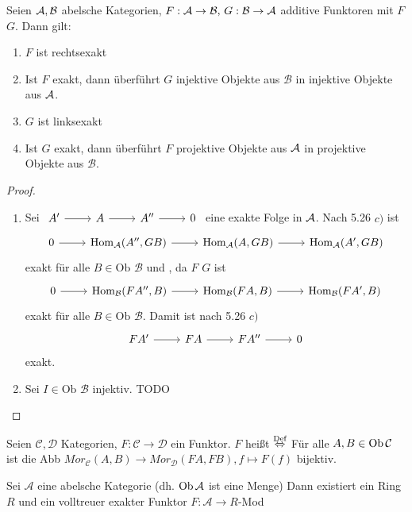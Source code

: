 \begin{sa}\label{5.33}
	Seien $\mathcal{A}, \mathcal{B}$ abelsche Kategorien, $F:\mathcal{A} \to \mathcal{B}, \, G: \mathcal{B} \to \mathcal{A}$ additive Funktoren mit $F$  $G$. Dann gilt:
	\begin{enumerate}[label= \alph*)]
		\item $F$ ist rechtsexakt
		\item Ist $F$ exakt, dann überführt $G$ injektive Objekte aus $\mathcal{B}$ in injektive Objekte aus $\mathcal{A}$.
		\item $G$ ist linksexakt
		\item Ist $G$ exakt, dann überführt $F$ projektive Objekte aus $\mathcal{A}$ in projektive Objekte aus $\mathcal{B}$.
	\end{enumerate}
\end{sa}
\begin{proof}
	\begin{enumerate}[label= \alph*)]
		\item Sei $\begin{tikzcd}
		A' \arrow{r} & A \arrow{r} & A'' \arrow{r} & 0
		\end{tikzcd}$ eine exakte Folge in $\mathcal{A}$. Nach 5.26 $c)$ ist 
			$$\begin{tikzcd}
		0 \arrow{r}& \Hom_\A(A'', GB) \arrow{r} & \Hom_\A(A,GB) \arrow{r} & \Hom_\A(A',GB)
		\end{tikzcd}$$
		exakt für alle $B\in \text{Ob }\mathcal{B}$ und , da $F$   $G$ ist
		$$\begin{tikzcd}
		0 \arrow{r}& \Hom_\mathcal{B}(FA'', B) \arrow{r} & \Hom_\mathcal{B}(FA,B) \arrow{r} & \Hom_\mathcal{B}(FA',B)
		\end{tikzcd}$$
		exakt für alle $B\in \text{Ob }\mathcal{B}$. Damit ist nach 5.26 $c)$
		$$\begin{tikzcd}
		FA' \arrow{r} & FA \arrow{r} & FA'' \arrow{r} & 0
		\end{tikzcd}$$
		exakt.
		\item Sei $I\in \text{Ob } \mathcal{B}$ injektiv.
		 TODO
	\end{enumerate}
\end{proof}
\begin{df}\label{5.34}
	Seien $\mathcal{C}, \mathcal{D} $ Kategorien, $F: \mathcal{C} \to \mathcal{D} $ ein Funktor. $F$ heißt  $\overset{\text{Def}}{\Leftrightarrow} $ Für alle $A,B \in \text{Ob}\,\mathcal{C} $ ist die Abb $Mor_{\mathcal{C}}(A,B) \to Mor_{\mathcal{D}}(FA,FB), f \mapsto F(f) $ bijektiv.
\end{df}
\begin{sa}\label{5.35}
	Sei $\mathcal{A} $ eine abelsche Kategorie (dh. $\text{Ob}\,\mathcal{A}$ ist eine Menge) Dann existiert ein Ring $R$ und ein volltreuer exakter Funktor $F: \mathcal{A} \to R$-Mod 
\end{sa}
